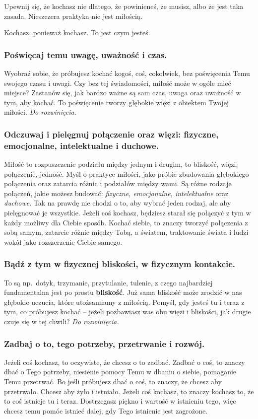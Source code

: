 \documentclass[../dotknieci-miloscia.tex]{subfiles}
\begin{document}
Upewnij się, że kochasz nie dlatego, że powinieneś, że musisz, albo że jest taka zasada.
Nieszczera praktyka nie jest miłością.

Kochasz, ponieważ kochasz. 
To jest czym jesteś.

\subsubsection{Poświęcaj temu uwagę, uważność i czas.}
Wyobraź sobie, że próbujesz kochać kogoś, coś, cokolwiek, 
bez poświęcenia Temu swojego czasu i uwagi.
Czy bez tej świadomości, miłość może w ogóle mieć miejsce?
Zastanów się, jak bardzo ważne są sam czas, uwaga oraz uważność w tym, aby kochać.
To poświęcenie tworzy głębokie więzi z obiektem Twojej miłości.
\emph{Do rozwinięcia.}

\subsubsection{Odczuwaj i pielęgnuj połączenie oraz więzi: fizyczne, emocjonalne, intelektualne i duchowe.}
Miłość to rozpuszczenie podziału między jednym i drugim, to bliskość, więzi, połączenie, jedność.
Myśl o praktyce miłości, jako próbie zbudowania głębokiego połączenia oraz zatarcia różnic i podziałów między wami.
Są różne rodzaje połączeń, jakie możesz budować: 
\emph{fizyczne, emocjonalne, intelektualne} oraz \emph{duchowe}.
Tak na prawdę nie chodzi o to, aby wybrać jeden rodzaj, ale aby pielęgnować je wszystkie.
Jeżeli coś kochasz, będziesz starał się połączyć z tym w każdy możliwy dla Ciebie sposób.
Kochać siebie, to znaczy tworzyć połączenia z sobą samym, 
zatarcie różnic między Tobą, a światem, 
traktowanie świata i ludzi wokół jako rozszerzenie Ciebie samego.

\subsubsection{Bądź z tym w fizycznej bliskości, w fizycznym kontakcie.}
To są np.\ dotyk, trzymanie, przytulanie, tulenie, 
z czego najbardziej fundamentalna jest po prostu \textbf{bliskość}.
Już sama bliskość może zrodzić w nas głębokie uczucia, które utożsamiamy z miłością.
Pomyśl, gdy jesteś tu i teraz z tym, co próbujesz kochać 
-- jeżeli pozbawiasz was obu więzi i bliskości, jak drugie czuje się w tej chwili?
\emph{Do rozwinięcia.}

\subsubsection{Zadbaj o to, tego potrzeby, przetrwanie i rozwój.}
Jeżeli coś kochasz, to oczywiste, że chcesz o to zadbać.
Zadbać o coś, to znaczy dbać o Tego potrzeby, 
niesienie pomocy Temu w dbaniu o siebie, pomaganie Temu przetrwać.
Bo jeśli próbujesz dbać o coś, to znaczy, że chcesz aby przetrwało.
Chcesz aby żyło i istniało.
Jeżeli coś kochasz, to znaczy kochasz to, że to coś istnieje tu i teraz.
Dostrzegasz piękno i wartość w istnieniu tego, 
więc chcesz temu pomóc istnieć dalej, gdy Tego istnienie jest zagrożone.
\end{document}
